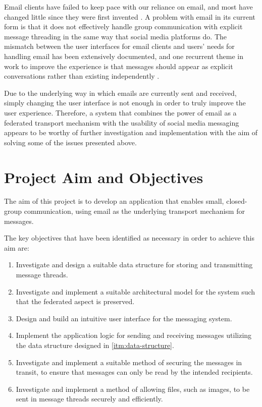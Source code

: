 Email clients have failed to keep pace with our reliance on email, and most have changed little since they were first invented \cite{rohall2004}. A problem with email in its current form is that it does not effectively handle group communication with explicit message threading in the same way that social media platforms do. The mismatch between the user interfaces for email clients and users' needs for handling email has been extensively documented, and one recurrent theme in work to improve the experience is that messages should appear as explicit conversations rather than existing independently \cite{venolia2003}.

Due to the underlying way in which emails are currently sent and received, simply changing the user interface is not enough in order to truly improve the user experience. Therefore, a system that combines the power of email as a federated transport mechanism with the usability of social media messaging appears to be worthy of further investigation and implementation with the aim of solving some of the issues presented above. 

\section{Project Aim and Objectives}

The aim of this project is to develop an application that enables small, closed-group communication, using email as the underlying transport mechanism for messages.

The key objectives that have been identified as necessary in order to achieve this aim are:

\begin{enumerate}
  \item \label{itm:data-structure} Investigate and design a suitable data structure for storing and transmitting message threads.
  \item Investigate and implement a suitable architectural model for the system such that the federated aspect is preserved.
  \item Design and build an intuitive user interface for the messaging system.
  \item Implement the application logic for sending and receiving messages utilizing the data structure designed in \ref{itm:data-structure}.
  \item Investigate and implement a suitable method of securing the messages in transit, to ensure that messages can only be read by the intended recipients.
  \item Investigate and implement a method of allowing files, such as images, to be sent in message threads securely and efficiently.
\end{enumerate}